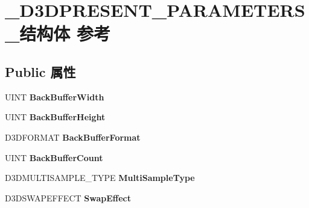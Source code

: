 \hypertarget{struct___d3_d_p_r_e_s_e_n_t___p_a_r_a_m_e_t_e_r_s__}{}\section{\+\_\+\+D3\+D\+P\+R\+E\+S\+E\+N\+T\+\_\+\+P\+A\+R\+A\+M\+E\+T\+E\+R\+S\+\_\+结构体 参考}
\label{struct___d3_d_p_r_e_s_e_n_t___p_a_r_a_m_e_t_e_r_s__}
\subsection*{Public 属性}
\begin{DoxyCompactItemize}
\item 
\mbox{\label{struct___d3_d_p_r_e_s_e_n_t___p_a_r_a_m_e_t_e_r_s___ade9f0a05ebf5fd4b0399b284624d3489}} 
U\+I\+NT {\bfseries Back\+Buffer\+Width}
\item 
\mbox{\label{struct___d3_d_p_r_e_s_e_n_t___p_a_r_a_m_e_t_e_r_s___a8e351a1861285c91fde9292c7d7ba3a2}} 
U\+I\+NT {\bfseries Back\+Buffer\+Height}
\item 
\mbox{\label{struct___d3_d_p_r_e_s_e_n_t___p_a_r_a_m_e_t_e_r_s___a7a118b06c30c53dfd6637032e102f194}} 
D3\+D\+F\+O\+R\+M\+AT {\bfseries Back\+Buffer\+Format}
\item 
\mbox{\label{struct___d3_d_p_r_e_s_e_n_t___p_a_r_a_m_e_t_e_r_s___a369513a223d242c8dd91d140bcfaf42a}} 
U\+I\+NT {\bfseries Back\+Buffer\+Count}
\item 
\mbox{\label{struct___d3_d_p_r_e_s_e_n_t___p_a_r_a_m_e_t_e_r_s___a4ea2455624e7060709ab4ad41ca9b9e5}} 
D3\+D\+M\+U\+L\+T\+I\+S\+A\+M\+P\+L\+E\+\_\+\+T\+Y\+PE {\bfseries Multi\+Sample\+Type}
\item 
\mbox{\label{struct___d3_d_p_r_e_s_e_n_t___p_a_r_a_m_e_t_e_r_s___a015ebf8bb15d87c6bf224a8689430782}} 
D3\+D\+S\+W\+A\+P\+E\+F\+F\+E\+CT {\bfseries Swap\+Effect}

\end{DoxyCompactItemize}

